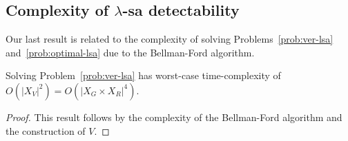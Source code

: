 \subsection{Complexity of $\lambda$-sa detectability}
Our last result is related to the complexity of solving Problems~\ref{prob:ver-lsa} and~\ref{prob:optimal-lsa} due to the Bellman-Ford algorithm.
\begin{theorem}\label{theo:complexity}
Solving Problem~\ref{prob:ver-lsa} has worst-case time-complexity of $O(|X_V|^2) = O(|X_G\times X_R|^4)$.
\end{theorem}
\begin{proof}
This result follows by the complexity of the Bellman-Ford algorithm and the construction of $V$.
\end{proof}
